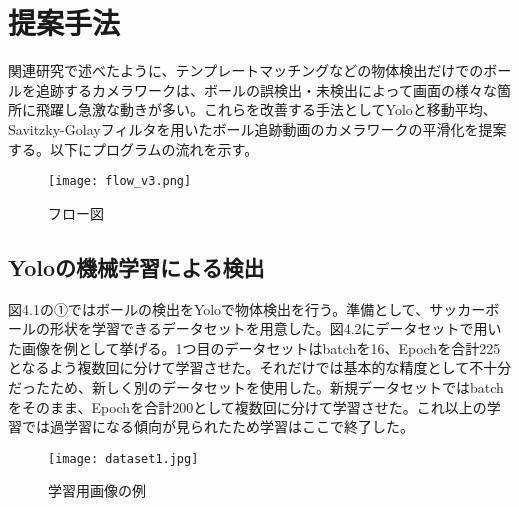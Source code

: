 \documentclass[11pt,a4j]{jreport}
\begin{document}



\chapter{提案手法}
関連研究で述べたように、テンプレートマッチングなどの物体検出だけでのボールを追跡するカメラワークは、ボールの誤検出・未検出によって画面の様々な箇所に飛躍し急激な動きが多い。これらを改善する手法としてYoloと移動平均、Savitzky-Golayフィルタを用いたボール追跡動画のカメラワークの平滑化を提案する。以下にプログラムの流れを示す。\\

\begin{figure}[htbp]
    \centering
    \texttt{[image: flow\_v3.png]}
    \caption{フロー図}
    \label{fig:ラベル}
\end{figure}

\section{Yoloの機械学習による検出}
図4.1の①ではボールの検出をYoloで物体検出を行う。準備として、サッカーボールの形状を学習できるデータセットを用意した。図4.2にデータセットで用いた画像を例として挙げる。1つ目のデータセットはbatchを16、Epochを合計225となるよう複数回に分けて学習させた。それだけでは基本的な精度として不十分だったため、新しく別のデータセットを使用した。新規データセットではbatchをそのまま、Epochを合計200として複数回に分けて学習させた。これ以上の学習では過学習になる傾向が見られたため学習はここで終了した。
\vspace{\baselineskip}
\begin{figure}[htbp]
    \centering
    \texttt{[image: dataset1.jpg]}
    \caption{学習用画像の例}
    \label{fig:ラベル}
\end{figure}
\end{document}
